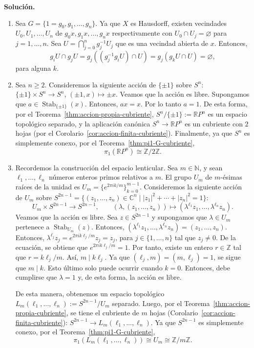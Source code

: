 \documentclass[11pt,a4paper]{article}
\theoremstyle{plain}
\theoremstyle{definition}
\theoremstyle{remark}
\newcommand{\RR}{\mathbb R}
\newcommand{\NN}{\mathbb N}
\newcommand{\ZZ}{\mathbb Z}
\newcommand{\CC}{\mathbb C}
\DeclareMathOperator{\Stab}{Stab}
\begin{document}
\begin{enumerate}[label=\arabic*.,leftmargin=*]
\noindent\textbf{Solución.}
\begin{enumerate}[label=\alph*)]
\item Sea $G=\{1=g_0,g_1,\dots,g_n\}$. Ya que $X$ es Hausdorff, existen
vecindades $U_0,U_1,\dots,U_n$ de $g_0x,g_1x,\dots,g_nx$ respectivamente con
$U_0\cap U_j=\varnothing$ para $j=1,\dots,n$. Sea $U=\bigcap_{j=0}^ng_j^{-1}U_j$
que es una vecindad abierta de $x$. Entonces,
\[
g_iU\cap g_jU=g_j((g_j^{-1}g_iU)\cap U)=g_j(g_kU\cap U)=\varnothing,
\]
para alguna $k$.
\item Sea $n\ge2$. Consideremos la siguiente acción de $\{\pm1\}$ sobre
$S^n$: $\{\pm1\}\times S^n\to S^n$, $(\pm1,x)\mapsto\pm x$. Veamos que la
acción es libre. Supongamos que $a\in\Stab_{\{\pm1\}}(x)$. Entonces, $ax=x$.
Por lo tanto $a=1$. De esta forma, por el
Teorema~\ref{thm:accion-propia-cubriente}, $S^n/\{\pm1\}:=\RR P^n$ es un
espacio topológico separado, y la aplicación canónica $S^n\to\RR P^n$ es un
cubriente con $2$ hojas (por el Corolario~\ref{cor:accion-finita-cubriente}).
Finalmente, ya que $S^n$ es simplemente conexo, por el
Teorema~\ref{thm:pi1-G-cubriente},
\[
\pi_1(\RR P^n)\cong\ZZ/2\ZZ.
\]
\item Recordemos la construcción del espacio lenticular. Sea $m\in\NN$, y
sean $\ell_1,\dots,\ell_n$ números enteros primos relativos a $m$. El grupo
$U_m$ de $m$-ésimas raíces de la unidad es
$U_m=\{e^{2\pi ik/m}\}_{k=0}^{m-1}$. Consideremos la siguiente acción de
$U_m$ sobre $S^{2n-1}=\{(z_1,\dots,z_n)\in\CC^n\mid|z_1|^2+\cdots+|z_n|^2=1\}$:
\[
U_m\times S^{2n-1}\to S^{2n-1}, \qquad (\lambda,(z_1,\dots,z_n))\mapsto(\lambda^{\ell_1}z_1,\dots,\lambda^{\ell_n}z_n).
\]
Veamos que la acción es libre. Sea $z\in S^{2n-1}$ y supongamos que
$\lambda\in U_m$ pertenece a $\Stab_{U_m}(z)$. Entonces,
$(\lambda^{\ell_1}z_1,\dots,\lambda^{\ell_n}z_n)=(z_1,\dots,z_n)$. Entonces,
$\lambda^{\ell_j}z_j=e^{2\pi ik\ell_j/m}z_j=z_j$, para $j\in\{1,\dots,n\}$
tal que $z_j\ne0$. De la ecuación, se obtiene que $e^{2\pi ik\ell_j/m}=1$.
Por tanto, existe un entero $r\in\ZZ$ tal que $r=k\ell_j/m$. Así, $m\mid k\ell_j$.
Ya que $(\ell_j,m)=(m,\ell_j)=1$, se sigue que $m\mid k$. Esto último solo
puede ocurrir cuando $k=0$. Entonces, debe cumplirse que $\lambda=1$ y, de
esta forma, la acción es libre.

De esta manera, obtenemos un espacio topológico $L_m(\ell_1,\dots,\ell_n):=S^{2n-1}/U_m$
separado. Luego, por el Teorema~\ref{thm:accion-propia-cubriente}, se tiene
el cubriente de $m$ hojas (Corolario~\ref{cor:accion-finita-cubriente}):
$S^{2n-1}\to L_m(\ell_1,\dots,\ell_n)$. Ya que $S^{2n-1}$ es simplemente
conexo, por el Teorema~\ref{thm:pi1-G-cubriente},
\[
\pi_1(L_m(\ell_1,\dots,\ell_n))\cong U_m\cong\ZZ/m\ZZ.
\]
\end{enumerate}


\end{enumerate}
\end{document}
